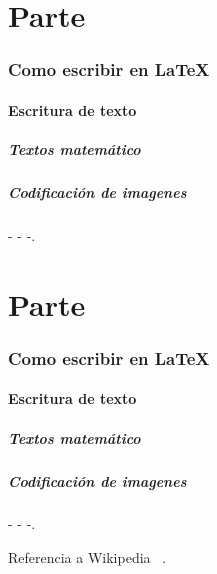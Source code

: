 \part*{Parte}

\section*{Como escribir en \LaTeX}

\subsection*{Escritura de texto}

\subsubsection*{Textos matemático}

\subsubsection*{Codificación de imagenes}
\noindent - - -.

\bigskip

\part{Parte}

\section{Como escribir en \LaTeX}

\subsection{Escritura de texto}

\subsubsection{Textos matemático}

\subsubsection{Codificación de imagenes}

\noindent - - -.

\bigskip

Referencia a Wikipedia ~\cite{eswiki:166659213}.

